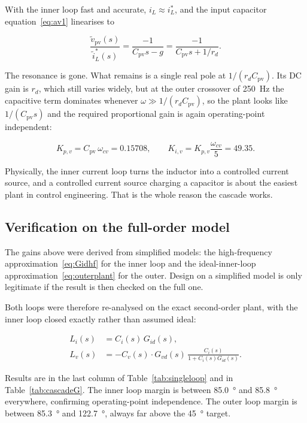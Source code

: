 With the inner loop fast and accurate, $i_L \approx i_L^\ast$, and the input
capacitor equation~\eqref{eq:av1} linearises to

\begin{equation}
\frac{\tilde v_{\mathrm{pv}}(s)}{\tilde i_L^\ast(s)}
= \frac{-1}{C_{\mathrm{pv}} s - g}
= \frac{-1}{C_{\mathrm{pv}} s + 1/r_d} .
\label{eq:outerplant}
\end{equation}

The resonance is gone. What remains is a single real pole at
$1/(r_d C_{\mathrm{pv}})$. Its DC gain is $r_d$, which still varies widely, but
at the outer crossover of \SI{250}{\hertz} the capacitive term dominates
whenever $\omega \gg 1/(r_d C_{\mathrm{pv}})$, so the plant looks like
$1/(C_{\mathrm{pv}} s)$ and the required proportional gain is again
operating-point independent:

\begin{equation}
K_{p,v} = C_{\mathrm{pv}}\,\omega_{cv} = \num{0.15708},
\qquad
K_{i,v} = K_{p,v}\frac{\omega_{cv}}{5} = \num{49.35}.
\end{equation}

Physically, the inner current loop turns the inductor into a controlled current
source, and a controlled current source charging a capacitor is about the
easiest plant in control engineering. That is the whole reason the cascade
works.

\subsection{Verification on the full-order model}

The gains above were derived from simplified models: the high-frequency
approximation~\eqref{eq:Gidhf} for the inner loop and the ideal-inner-loop
approximation~\eqref{eq:outerplant} for the outer. Design on a simplified model
is only legitimate if the result is then checked on the full one.

Both loops were therefore re-analysed on the exact second-order plant, with the
inner loop closed exactly rather than assumed ideal:

\begin{align}
L_i(s) &= C_i(s)\,G_{id}(s), \\
L_v(s) &= -C_v(s)\cdot G_{vd}(s)\,\frac{C_i(s)}{1 + C_i(s) G_{id}(s)} .
\end{align}

Results are in the last column of Table~\ref{tab:singleloop} and in
Table~\ref{tab:cascadeG}. The inner loop margin is between \SI{85.0}{\degree}
and \SI{85.8}{\degree} everywhere, confirming operating-point independence. The
outer loop margin is between \SI{85.3}{\degree} and \SI{122.7}{\degree}, always
far above the \SI{45}{\degree} target.

